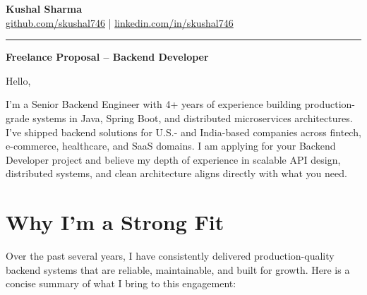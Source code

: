 \documentclass[11pt,letterpaper]{article}
\begin{document}
\begin{center}
    {\LARGE \textbf{Kushal Sharma}} \\
    \vspace{3pt}
    \small
    \href{https://github.com/skushal746}{github.com/skushal746} \quad|\quad
    \href{https://www.linkedin.com/in/skushal746}{linkedin.com/in/skushal746}
\end{center}

\vspace{0.5em}
\noindent\rule{\linewidth}{0.6pt}
\vspace{0.2em}

{\Large \textbf{Freelance Proposal -- Backend Developer}}

\vspace{0.3em}

Hello,

I'm a Senior Backend Engineer with 4+ years of experience building production-grade systems in Java, Spring Boot, and distributed microservices architectures. I've shipped backend solutions for U.S.- and India-based companies across fintech, e-commerce, healthcare, and SaaS domains. I am applying for your Backend Developer project and believe my depth of experience in scalable API design, distributed systems, and clean architecture aligns directly with what you need.

\section{Why I'm a Strong Fit}

Over the past several years, I have consistently delivered production-quality backend systems that are reliable, maintainable, and built for growth. Here is a concise summary of what I bring to this engagement:
\end{document}

